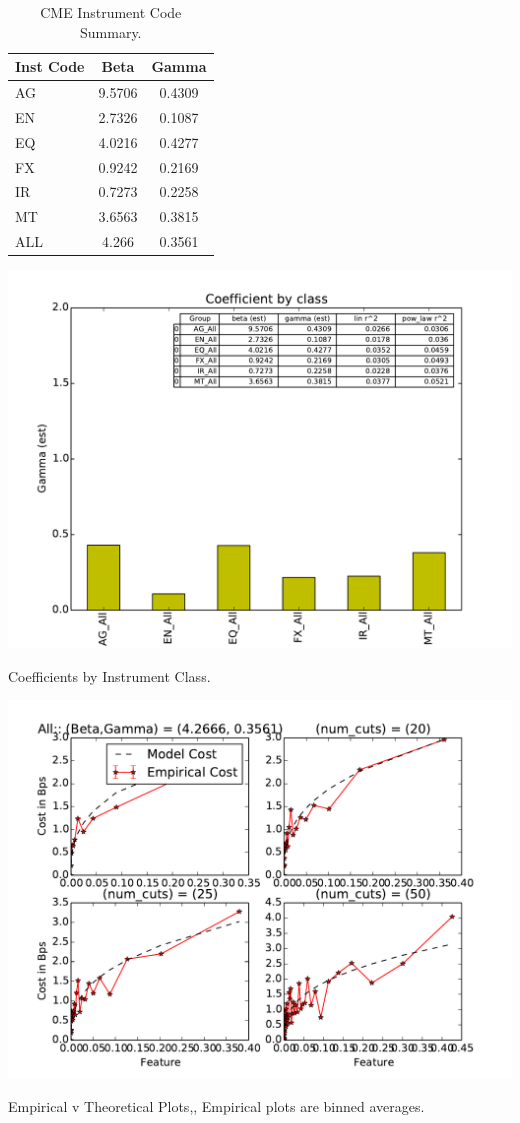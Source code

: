 \documentclass{article}
\begin{document}
\begin{table}
\centering
\begin{tabular}{|l|c|c|}
\hline
Inst Code & Beta & Gamma \\
\hline
AG & 9.5706 & 0.4309 \\
EN & 2.7326 & 0.1087 \\
EQ & 4.0216 & 0.4277 \\
FX & 0.9242 & 0.2169 \\
IR & 0.7273 & 0.2258 \\
MT & 3.6563 & 0.3815\\
\hline
\hline
ALL & 4.266 & 0.3561 \\
\hline
\end{tabular}
\caption{CME Instrument Code Summary.}
\label{tab:template}
\end{table}

\includegraphics[scale=.74]{./figs/fig1.pdf}

Coefficients by Instrument Class.

\includegraphics[scale=.74]{./figs//fig2.pdf}

Empirical v Theoretical Plots,, Empirical plots are binned averages.





\end{document}

